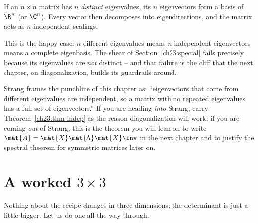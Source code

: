 \begin{corollary}
\label{ch23:cor-basis}
If an $n\times n$ matrix has $n$ \emph{distinct} eigenvalues, its $n$ eigenvectors
form a basis of $\R^n$ (or $\C^n$). Every vector then decomposes into
eigendirections, and the matrix acts as $n$ independent scalings.
\end{corollary}

This is the happy case: $n$ different eigenvalues means $n$ independent
eigenvectors means a complete eigenbasis. The shear of Section~\ref{ch23:special}
fails precisely because its eigenvalues are \emph{not} distinct -- and that failure
is the cliff that the next chapter, on diagonalization, builds its guardrails
around.

\begin{strangbox}
Strang frames the punchline of this chapter as: ``eigenvectors that come from
different eigenvalues are independent, so a matrix with no repeated eigenvalues has
a full set of eigenvectors.'' If you are heading \emph{into} Strang, carry
Theorem~\ref{ch23:thm-indep} as the reason diagonalization will work; if you are
coming \emph{out} of Strang, this is the theorem you will lean on to write
$\mat{A}=\mat{X}\mat{\Lambda}\mat{X}\inv$ in the next chapter and to justify the
spectral theorem for symmetric matrices later on.
\end{strangbox}

\section{A worked $3\times 3$}
\label{ch23:threebythree}

Nothing about the recipe changes in three dimensions; the determinant is just a
little bigger. Let us do one all the way through.

